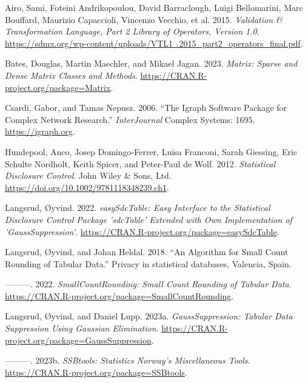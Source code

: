 \hypertarget{refs}{}
\begin{CSLReferences}{1}{0}
\leavevmode{}%
Airo, Sami, Foteini Andrikopoulou, David Barraclough, Luigi Bellomarini, Marc Bouffard, Maurizio Capaccioli, Vincenzo Vecchio, et al. 2015. \emph{Validation \& Transformation Language, Part 2 Library of Operators, Version 1.0}. \url{https://sdmx.org/wp-content/uploads/VTL1_2015_part2_operators_final.pdf}.

\leavevmode{}%
Bates, Douglas, Martin Maechler, and Mikael Jagan. 2023. \emph{{Matrix}: Sparse and Dense Matrix Classes and Methods}. \url{https://CRAN.R-project.org/package=Matrix}.

\leavevmode{}%
Csardi, Gabor, and Tamas Nepusz. 2006. {``The Igraph Software Package for Complex Network Research.''} \emph{InterJournal} Complex Systems: 1695. \url{https://igraph.org}.

\leavevmode{}%
Hundepool, Anco, Josep Domingo-Ferrer, Luisa Franconi, Sarah Giessing, Eric Schulte Nordholt, Keith Spicer, and Peter-Paul de Wolf. 2012. \emph{Statistical Disclosure Control}. John Wiley \& Sons, Ltd. \url{https://doi.org/10.1002/9781118348239.ch1}.

\leavevmode{}%
Langsrud, Øyvind. 2022. \emph{{easySdcTable}: Easy Interface to the Statistical Disclosure Control Package 'sdcTable' Extended with Own Implementation of 'GaussSuppression'}. \url{https://CRAN.R-project.org/package=easySdcTable}.

\leavevmode{}%
Langsrud, Øyvind, and Johan Heldal. 2018. {``{An Algorithm for Small Count Rounding of Tabular Data}.''} {Privacy in statistical databases, Valencia, Spain}.

\leavevmode{}%
---------. 2022. \emph{{SmallCountRounding}: Small Count Rounding of Tabular Data}. \url{https://CRAN.R-project.org/package=SmallCountRounding}.

\leavevmode{}%
Langsrud, Øyvind, and Daniel Lupp. 2023a. \emph{{GaussSuppression}: Tabular Data Suppression Using Gaussian Elimination}. \url{https://CRAN.R-project.org/package=GaussSuppression}.

\leavevmode{}%
---------. 2023b. \emph{{SSBtools}: Statistics Norway's Miscellaneous Tools}. \url{https://CRAN.R-project.org/package=SSBtools}.


\end{CSLReferences}
